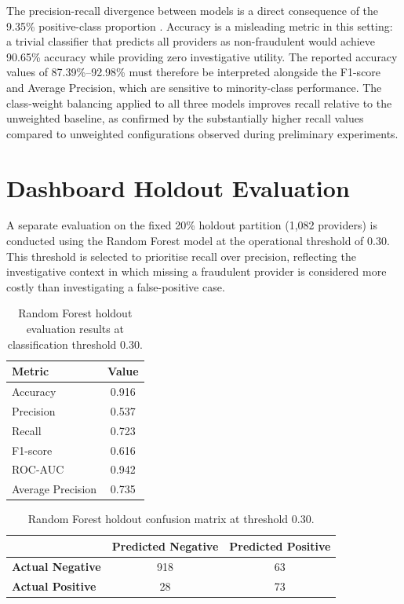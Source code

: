 The precision-recall divergence between models is a direct consequence of the 9.35\% positive-class proportion \cite{b10}. Accuracy is a misleading metric in this setting: a trivial classifier that predicts all providers as non-fraudulent would achieve 90.65\% accuracy while providing zero investigative utility. The reported accuracy values of 87.39\%--92.98\% must therefore be interpreted alongside the F1-score and Average Precision, which are sensitive to minority-class performance. The class-weight balancing applied to all three models improves recall relative to the unweighted baseline, as confirmed by the substantially higher recall values compared to unweighted configurations observed during preliminary experiments.

\section{Dashboard Holdout Evaluation}
\label{sec:holdout}

A separate evaluation on the fixed 20\% holdout partition (1,082 providers) is conducted using the Random Forest model at the operational threshold of 0.30. This threshold is selected to prioritise recall over precision, reflecting the investigative context in which missing a fraudulent provider is considered more costly than investigating a false-positive case.

\begin{table}[htbp]
\centering
\caption{Random Forest holdout evaluation results at classification threshold 0.30.}
\label{tab:holdout-results}
\begin{tabular}{@{}lc@{}}
\toprule
\textbf{Metric} & \textbf{Value} \\
\midrule
Accuracy         & 0.916 \\
Precision        & 0.537 \\
Recall           & 0.723 \\
F1-score         & 0.616 \\
ROC-AUC          & 0.942 \\
Average Precision & 0.735 \\
\bottomrule
\end{tabular}
\end{table}

\begin{table}[htbp]
\centering
\caption{Random Forest holdout confusion matrix at threshold 0.30.}
\label{tab:conf-matrix}
\begin{tabular}{@{}lcc@{}}
\toprule
 & \textbf{Predicted Negative} & \textbf{Predicted Positive} \\
\midrule
\textbf{Actual Negative} & 918 & 63 \\
\textbf{Actual Positive} & 28  & 73 \\
\bottomrule
\end{tabular}
\end{table}

